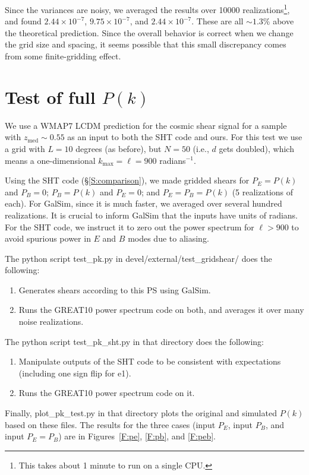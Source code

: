 \documentclass[preprint]{aastex}
\newcommand{\kmax}{\ensuremath{k_\mathrm{max}}}
\begin{document}
Since the variances are noisy, we averaged the results over 10000
realizations\footnote{This takes about 1 minute to run on a single
  CPU.}, and found $2.44\times 10^{-7}$, $9.75\times 10^{-7}$, and
$2.44\times 10^{-7}$.  These are all $\sim 1.3$\% above the
theoretical prediction. 
Since the overall behavior is correct when we change the grid size and
spacing, it seems possible that this small discrepancy comes from some
finite-gridding effect.

\section{Test of full $P(k)$}\label{S:testpk}

We use a WMAP7 LCDM prediction for the cosmic shear signal for a
sample with $z_\mathrm{med}\sim 0.55$ as an input to both
the SHT code and ours.  For this test we use a grid with
$L=10$ degrees (as before), but $N=50$ (i.e., $d$ gets doubled), which
means a one-dimensional $\kmax=\ell=900$ radians$^{-1}$.

Using the SHT code (\S\ref{S:comparison}), we made gridded shears for
$P_E=P(k)$ and $P_B=0$; $P_B=P(k)$ and $P_E=0$; and $P_E=P_B=P(k)$ (5
realizations of each).  For GalSim, since it is much faster, we
averaged over several hundred realizations.  It is crucial to inform
GalSim that the inputs have units of radians.  For the SHT code, we
instruct it to zero out the power spectrum for $\ell>900$ to avoid
spurious power in $E$ and $B$ modes due to aliasing.

The python script test\_pk.py in devel/external/test\_gridshear/ does the following:
\begin{enumerate}
\item Generates shears according to this PS using GalSim.
\item Runs the GREAT10 power spectrum code on both, and averages it over  many 
  noise realizations.
\end{enumerate}

The python script test\_pk\_sht.py in that directory does the following:
\begin{enumerate}
\item Manipulate outputs of the SHT code to be consistent with
  expectations (including one sign flip for e1).
\item Runs the GREAT10 power spectrum code on it.
\end{enumerate}

Finally, plot\_pk\_test.py in that directory plots the original and
simulated $P(k)$ based on these files.  The results for the three
cases (input $P_E$, input $P_B$, and input $P_E=P_B$) are in
Figures~\ref{F:pe}, \ref{F:pb}, and \ref{F:peb}.
\end{document}
